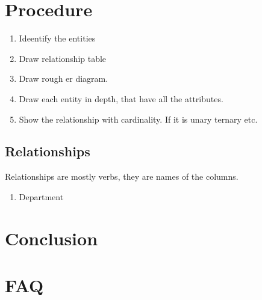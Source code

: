 \documentclass[11pt]{article}
\begin{document}
\section{Procedure}
\begin{enumerate}
    \item Ideentify the entities 
    \item Draw relationship table
    \item Draw rough er diagram.
    \item Draw each entity in depth, that have all the attributes. 
    \item Show the relationship with cardinality. If it is unary ternary etc. 
\end{enumerate}


\subsection{Relationships}
Relationships are mostly verbs, they are names of the columns.

\begin{enumerate}
	\item Department
\end{enumerate}






% 

% 

\section{Conclusion}

\clearpage

\section{FAQ}
\end{document}
